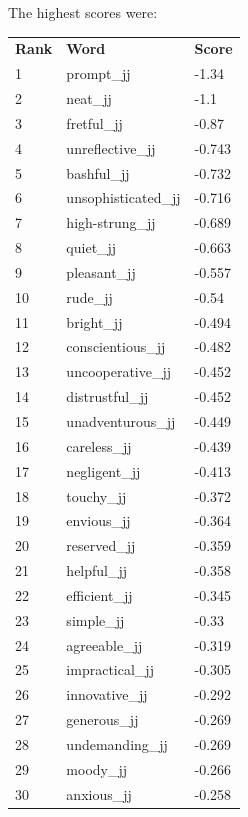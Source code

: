 \documentclass[10pt,letterpaper]{book}
\begin{document}
The highest scores were:
\begin{tabular}{ l l l }
        \textbf{Rank} & \textbf{Word} & \textbf{Score} \\
        1 & prompt\_jj & -1.34 \\
        2 & neat\_jj & -1.1 \\
        3 & fretful\_jj & -0.87 \\
        4 & unreflective\_jj & -0.743 \\
        5 & bashful\_jj & -0.732 \\
        6 & unsophisticated\_jj & -0.716 \\
        7 & high-strung\_jj & -0.689 \\
        8 & quiet\_jj & -0.663 \\
        9 & pleasant\_jj & -0.557 \\
        10 & rude\_jj & -0.54 \\
        11 & bright\_jj & -0.494 \\
        12 & conscientious\_jj & -0.482 \\
        13 & uncooperative\_jj & -0.452 \\
        14 & distrustful\_jj & -0.452 \\
        15 & unadventurous\_jj & -0.449 \\
        16 & careless\_jj & -0.439 \\
        17 & negligent\_jj & -0.413 \\
        18 & touchy\_jj & -0.372 \\
        19 & envious\_jj & -0.364 \\
        20 & reserved\_jj & -0.359 \\
        21 & helpful\_jj & -0.358 \\
        22 & efficient\_jj & -0.345 \\
        23 & simple\_jj & -0.33 \\
        24 & agreeable\_jj & -0.319 \\
        25 & impractical\_jj & -0.305 \\
        26 & innovative\_jj & -0.292 \\
        27 & generous\_jj & -0.269 \\
        28 & undemanding\_jj & -0.269 \\
        29 & moody\_jj & -0.266 \\
        30 & anxious\_jj & -0.258 \\
\end{tabular}
\end{document}
